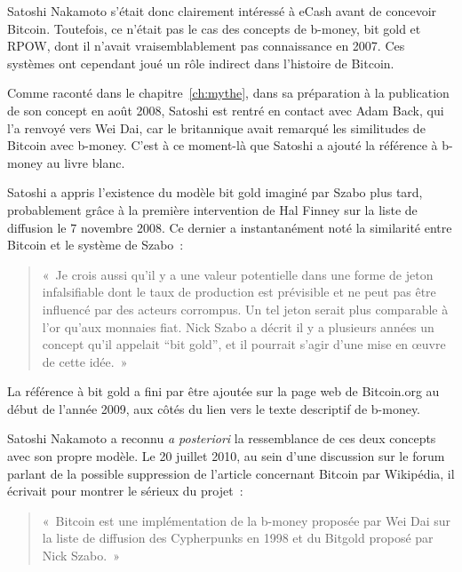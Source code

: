 Satoshi Nakamoto s'était donc clairement intéressé à eCash avant de concevoir Bitcoin. Toutefois, ce n'était pas le cas des concepts de b-money, bit gold et RPOW, dont il n'avait vraisemblablement pas connaissance en 2007. Ces systèmes ont cependant joué un rôle indirect dans l'histoire de Bitcoin.

Comme raconté dans le chapitre~\ref{ch:mythe}, dans sa préparation à la publication de son concept en août 2008, Satoshi est rentré en contact avec Adam Back, qui l'a renvoyé vers Wei Dai, car le britannique avait remarqué les similitudes de Bitcoin avec b-money. C'est à ce moment-là que Satoshi a ajouté la référence à b-money au livre blanc.

Satoshi a appris l'existence du modèle bit gold imaginé par Szabo plus tard, probablement grâce à la première intervention de Hal Finney sur la liste de diffusion le 7 novembre 2008. Ce dernier a instantanément noté la similarité entre Bitcoin et le système de Szabo~:

\begin{quote}
«~Je crois aussi qu'il y a une valeur potentielle dans une forme de jeton infalsifiable dont le taux de production est prévisible et ne peut pas être influencé par des acteurs corrompus. Un tel jeton serait plus comparable à l'or qu'aux monnaies fiat. Nick Szabo a décrit il y a plusieurs années un concept qu'il appelait “bit gold”, et il pourrait s'agir d'une mise en œuvre de cette idée.~»
\end{quote}

La référence à bit gold a fini par être ajoutée sur la page web de Bitcoin.org au début de l'année 2009, aux côtés du lien vers le texte descriptif de b-money.

Satoshi Nakamoto a reconnu \emph{a posteriori} la ressemblance de ces deux concepts avec son propre modèle. Le 20 juillet 2010, au sein d'une discussion sur le forum parlant de la possible suppression de l'article concernant Bitcoin par Wikipédia, il écrivait pour montrer le sérieux du projet~:

\begin{quote}
«~Bitcoin est une implémentation de la b-money proposée par Wei Dai sur la liste de diffusion des Cypherpunks en 1998 et du Bitgold proposé par Nick Szabo.~»
\end{quote}

